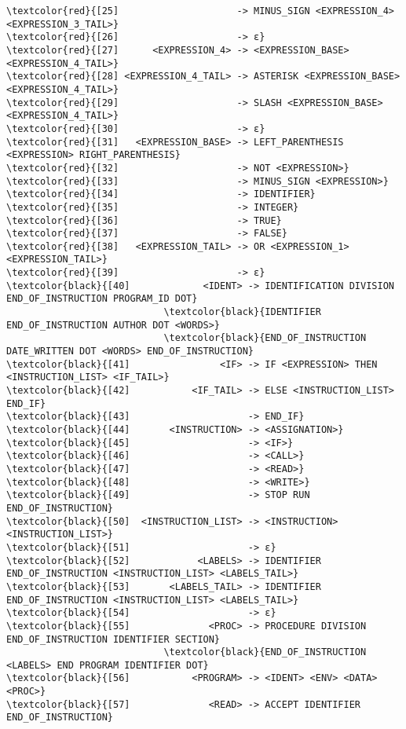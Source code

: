 \begin{Verbatim}[commandchars=\\\{\}]
\textcolor{red}{[25]                     -> MINUS_SIGN <EXPRESSION_4> <EXPRESSION_3_TAIL>}
\textcolor{red}{[26]                     -> ε}
\textcolor{red}{[27]      <EXPRESSION_4> -> <EXPRESSION_BASE> <EXPRESSION_4_TAIL>}
\textcolor{red}{[28] <EXPRESSION_4_TAIL> -> ASTERISK <EXPRESSION_BASE> <EXPRESSION_4_TAIL>}
\textcolor{red}{[29]                     -> SLASH <EXPRESSION_BASE> <EXPRESSION_4_TAIL>}
\textcolor{red}{[30]                     -> ε}
\textcolor{red}{[31]   <EXPRESSION_BASE> -> LEFT_PARENTHESIS <EXPRESSION> RIGHT_PARENTHESIS}
\textcolor{red}{[32]                     -> NOT <EXPRESSION>}
\textcolor{red}{[33]                     -> MINUS_SIGN <EXPRESSION>}
\textcolor{red}{[34]                     -> IDENTIFIER}
\textcolor{red}{[35]                     -> INTEGER}
\textcolor{red}{[36]                     -> TRUE}
\textcolor{red}{[37]                     -> FALSE}
\textcolor{red}{[38]   <EXPRESSION_TAIL> -> OR <EXPRESSION_1> <EXPRESSION_TAIL>}
\textcolor{red}{[39]                     -> ε}
\textcolor{black}{[40]             <IDENT> -> IDENTIFICATION DIVISION END_OF_INSTRUCTION PROGRAM_ID DOT}
                            \textcolor{black}{IDENTIFIER END_OF_INSTRUCTION AUTHOR DOT <WORDS>}
                            \textcolor{black}{END_OF_INSTRUCTION DATE_WRITTEN DOT <WORDS> END_OF_INSTRUCTION}
\textcolor{black}{[41]                <IF> -> IF <EXPRESSION> THEN <INSTRUCTION_LIST> <IF_TAIL>}
\textcolor{black}{[42]           <IF_TAIL> -> ELSE <INSTRUCTION_LIST> END_IF}
\textcolor{black}{[43]                     -> END_IF}
\textcolor{black}{[44]       <INSTRUCTION> -> <ASSIGNATION>}
\textcolor{black}{[45]                     -> <IF>}
\textcolor{black}{[46]                     -> <CALL>}
\textcolor{black}{[47]                     -> <READ>}
\textcolor{black}{[48]                     -> <WRITE>}
\textcolor{black}{[49]                     -> STOP RUN END_OF_INSTRUCTION}
\textcolor{black}{[50]  <INSTRUCTION_LIST> -> <INSTRUCTION> <INSTRUCTION_LIST>}
\textcolor{black}{[51]                     -> ε}
\textcolor{black}{[52]            <LABELS> -> IDENTIFIER END_OF_INSTRUCTION <INSTRUCTION_LIST> <LABELS_TAIL>}
\textcolor{black}{[53]       <LABELS_TAIL> -> IDENTIFIER END_OF_INSTRUCTION <INSTRUCTION_LIST> <LABELS_TAIL>}
\textcolor{black}{[54]                     -> ε}
\textcolor{black}{[55]              <PROC> -> PROCEDURE DIVISION END_OF_INSTRUCTION IDENTIFIER SECTION}
                            \textcolor{black}{END_OF_INSTRUCTION <LABELS> END PROGRAM IDENTIFIER DOT}
\textcolor{black}{[56]           <PROGRAM> -> <IDENT> <ENV> <DATA> <PROC>}
\textcolor{black}{[57]              <READ> -> ACCEPT IDENTIFIER END_OF_INSTRUCTION}

\end{Verbatim}
